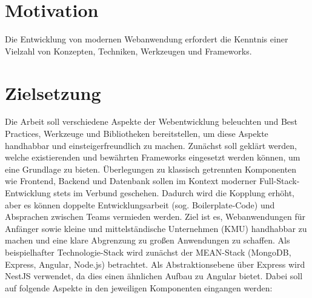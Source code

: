
\section{Motivation}\label{sec:motivation}

Die Entwicklung von modernen Webanwendung erfordert die Kenntnis einer Vielzahl von Konzepten, Techniken, Werkzeugen und Frameworks.

\section{Zielsetzung}\label{sec:zielsetzung}

Die Arbeit soll verschiedene Aspekte der Webentwicklung beleuchten und Best Practices, Werkzeuge und Bibliotheken bereitstellen, um diese Aspekte handhabbar und einsteigerfreundlich zu machen.
Zunächst soll geklärt werden, welche existierenden und bewährten Frameworks eingesetzt werden können, um eine Grundlage zu bieten.
Überlegungen zu klassisch getrennten Komponenten wie Frontend, Backend und Datenbank sollen im Kontext moderner Full-Stack-Entwicklung stets im Verbund geschehen.
Dadurch wird die Kopplung erhöht, aber es können doppelte Entwicklungsarbeit (sog. Boilerplate-Code) und Absprachen zwischen Teams vermieden werden.
Ziel ist es, Webanwendungen für Anfänger sowie kleine und mittelständische Unternehmen (KMU) handhabbar zu machen und eine klare Abgrenzung zu großen Anwendungen zu schaffen.
Als beispielhafter Technologie-Stack wird zunächst der MEAN-Stack (MongoDB, Express, Angular, Node.js) betrachtet.
Als Abstraktionsebene über Express wird NestJS verwendet, da dies einen ähnlichen Aufbau zu Angular bietet.
Dabei soll auf folgende Aspekte in den jeweiligen Komponenten eingangen werden:

